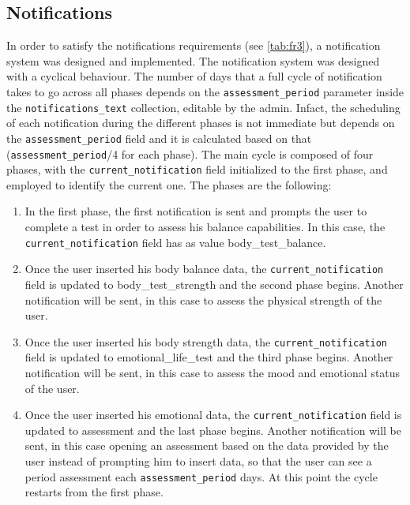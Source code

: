 \subsection{Notifications}
\label{subsec:notifications}
In order to satisfy the notifications requirements (see \cref{tab:fr3}), a notification system was designed and implemented. The notification system was designed with a cyclical behaviour. 
\newline The number of days that a full cycle of notification takes to go across all phases depends on the \texttt{assessment\_period} parameter inside the \texttt{notifications\_text} collection, editable by the admin. Infact, the scheduling of each notification during the different phases is not immediate but depends on the \texttt{assessment\_period} field and it is calculated based on that (\texttt{assessment\_period}/4 for each phase).  
\newline The main cycle is composed of four phases, with the \texttt{current\_notification} field initialized to the first phase, and employed to identify the current one. The phases are the following:
\begin{enumerate}[nosep] %
    \item In the first phase, the first notification is sent and prompts the user to complete a test in order to assess his balance capabilities. In this case, the \texttt{current\_notification} field has as value body\_test\_balance.
    \item Once the user inserted his body balance data, the \texttt{current\_notification} field is updated to body\_test\_strength and the second phase begins. Another notification will be sent, in this case to assess the physical strength of the user. 
    \item Once the user inserted his body strength data, the \texttt{current\_notification} field is updated to emotional\_life\_test and the third phase begins. Another notification will be sent, in this case to assess the mood and emotional status of the user.
    \item Once the user inserted his emotional data, the \texttt{current\_notification} field is updated to assessment and the last phase begins. Another notification will be sent, in this case opening an assessment based on the data provided by the user instead of prompting him to insert data, so that the user can see a period assessment each \texttt{assessment\_period} days. At this point the cycle restarts from the first phase.
\end{enumerate}

